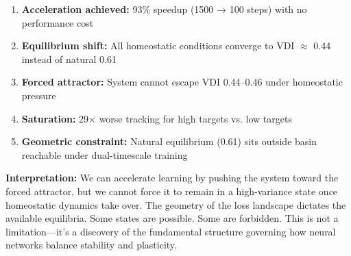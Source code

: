 \begin{enumerate}
\item \textbf{Acceleration achieved:} 93\% speedup (1500 → 100 steps) with no performance cost
\item \textbf{Equilibrium shift:} All homeostatic conditions converge to VDI $\approx$ 0.44 instead of natural 0.61
\item \textbf{Forced attractor:} System cannot escape VDI 0.44--0.46 under homeostatic pressure
\item \textbf{Saturation:} 29× worse tracking for high targets vs. low targets
\item \textbf{Geometric constraint:} Natural equilibrium (0.61) sits outside basin reachable under dual-timescale training
\end{enumerate}

\textbf{Interpretation:} We can accelerate learning by pushing the system toward the forced attractor, but we cannot force it to remain in a high-variance state once homeostatic dynamics take over. The geometry of the loss landscape dictates the available equilibria. Some states are possible. Some are forbidden. This is not a limitation—it's a discovery of the fundamental structure governing how neural networks balance stability and plasticity.

